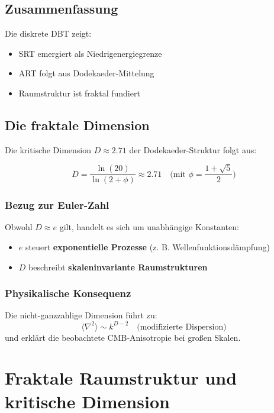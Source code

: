 \subsection{Zusammenfassung}
Die diskrete DBT zeigt:
\begin{itemize}
\item SRT emergiert als Niedrigenergiegrenze
\item ART folgt aus Dodekaeder-Mittelung
\item Raumstruktur ist fraktal fundiert
\end{itemize}

\subsection{Die fraktale Dimension}  
\label{subsec:fractal_dimension}  

Die kritische Dimension $D \approx 2.71$ der Dodekaeder-Struktur folgt aus:  

\begin{equation}  
D = \frac{\ln(20)}{\ln(2 + \phi)} \approx 2.71 \quad \text{(mit } \phi = \frac{1 + \sqrt{5}}{2}\text{)}  
\end{equation}  

\subsubsection*{Bezug zur Euler-Zahl}  
Obwohl $D \approx e$ gilt, handelt es sich um unabhängige Konstanten:  
\begin{itemize}  
\item $e$ steuert \textbf{exponentielle Prozesse} (z. B. Wellenfunktionsdämpfung)  
\item $D$ beschreibt \textbf{skaleninvariante Raumstrukturen}  
\end{itemize}  

\subsubsection*{Physikalische Konsequenz}  
Die nicht-ganzzahlige Dimension führt zu:  
\begin{equation}  
\langle \nabla^2 \rangle \sim k^{D-2} \quad \text{(modifizierte Dispersion)}  
\end{equation}  
und erklärt die beobachtete CMB-Anisotropie bei großen Skalen.  

\section{Fraktale Raumstruktur und kritische Dimension}
\label{sec:fractal_structure}

